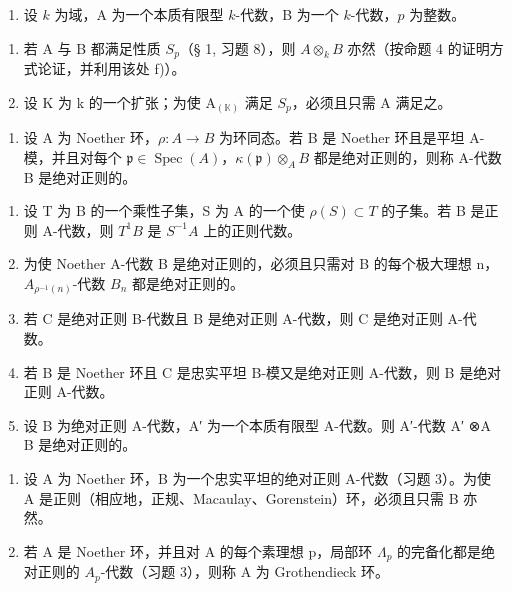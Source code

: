 \begin{enumerate}
\def\labelenumi{\arabic{enumi})}
\setcounter{enumi}{1}
\tightlist
\item
  设 \(k\) 为域，A 为一个本质有限型 \(k\)-代数，B 为一个 \(k\)-代数，\(p\) 为整数。
\end{enumerate}

\begin{enumerate}
\def\labelenumi{\alph{enumi})}
\item
  若 A 与 B 都满足性质 \(S_{p}\)（§ 1, 习题 8），则 \(A \otimes_{k} B\) 亦然（按命题 4 的证明方式论证，并利用该处 f)）。
\item
  设 K 为 k 的一个扩张；为使 \(\mathrm{A}_{(\mathbb{K})}\) 满足 \(S_{p}\)，必须且只需 A 满足之。
\end{enumerate}

\begin{enumerate}
\def\labelenumi{\arabic{enumi})}
\setcounter{enumi}{2}
\tightlist
\item
  设 A 为 Noether 环，\(\rho : A \to B\) 为环同态。若 B 是 Noether 环且是平坦 A-模，并且对每个 \(\mathfrak{p} \in \operatorname{Spec}(A)\)，\(\kappa(\mathfrak{p}) \otimes_{A} B\) 都是绝对正则的，则称 A-代数 B 是绝对正则的。
\end{enumerate}

\begin{enumerate}
\def\labelenumi{\alph{enumi})}
\item
  设 T 为 B 的一个乘性子集，S 为 A 的一个使 \(\rho(S) \subset T\) 的子集。若 B 是正则 A-代数，则 \(T^{1}B\) 是 \(S^{-1}A\) 上的正则代数。
\item
  为使 Noether A-代数 B 是绝对正则的，必须且只需对 B 的每个极大理想 n，\(A_{\rho^{-1}(n)}\)-代数 \(B_{n}\) 都是绝对正则的。
\item
  若 C 是绝对正则 B-代数且 B 是绝对正则 A-代数，则 C 是绝对正则 A-代数。
\item
  若 B 是 Noether 环且 C 是忠实平坦 B-模又是绝对正则 A-代数，则 B 是绝对正则 A-代数。
\item
  设 B 为绝对正则 A-代数，A′ 为一个本质有限型 A-代数。则 A′-代数 A′ ⊗A B 是绝对正则的。
\end{enumerate}

\begin{enumerate}
\def\labelenumi{\arabic{enumi})}
\setcounter{enumi}{3}
\item
  设 A 为 Noether 环，B 为一个忠实平坦的绝对正则 A-代数（习题 3）。为使 A 是正则（相应地，正规、Macaulay、Gorenstein）环，必须且只需 B 亦然。
\item
  若 A 是 Noether 环，并且对 A 的每个素理想 p，局部环 \(\Lambda_{p}\) 的完备化都是绝对正则的 \(A_{p}\)-代数（习题 3），则称 A 为 Grothendieck 环。
\end{enumerate}


